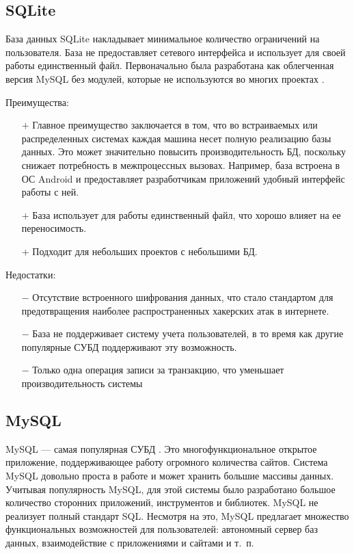 \subsection{SQLite}

База данных SQLite накладывает минимальное количество ограничений на пользователя.
База не предоставляет сетевого интерфейса и использует для своей работы единственный файл.
Первоначально была разработана как облегченная версия MySQL без модулей, которые не используются во многих проектах \cite{sqlite}.

Преимущества:
\begin{itemize}
	\item[$+$] Главное преимущество заключается в том, что во встраиваемых или распределенных системах каждая машина несет полную реализацию базы данных.
	Это может значительно повысить производительность БД, поскольку снижает потребность в межпроцессных вызовах.
	Например, база встроена в ОС Android и предоставляет разработчикам приложений удобный интерфейс работы с ней.
	\item[$+$] База использует для работы единственный файл, что хорошо влияет на ее переносимость.
	\item[$+$] Подходит для небольших проектов с небольшими БД.
\end{itemize}

Недостатки:
\begin{itemize}
	\item[$-$] Отсутствие встроенного шифрования данных, что стало стандартом для предотвращения наиболее распространенных хакерских атак в интернете.
	\item[$-$] База не поддерживает систему учета пользователей, в то время как другие популярные СУБД поддерживают эту возможность.
	\item[$-$] Только одна операция записи за транзакцию, что уменьшает производительность системы
\end{itemize}

\subsection{MySQL}

MySQL — самая популярная СУБД \cite{mysql}.
Это многофункциональное открытое приложение, поддерживающее работу огромного количества сайтов.
Система MySQL довольно проста в работе и может хранить большие массивы данных.
Учитывая популярность MySQL, для этой системы было разработано большое количество сторонних приложений, инструментов и библиотек.
MySQL не реализует полный стандарт SQL.
Несмотря на это, MySQL предлагает множество функциональных возможностей для пользователей: автономный сервер баз данных, взаимодействие с приложениями и сайтами и т.~п.

